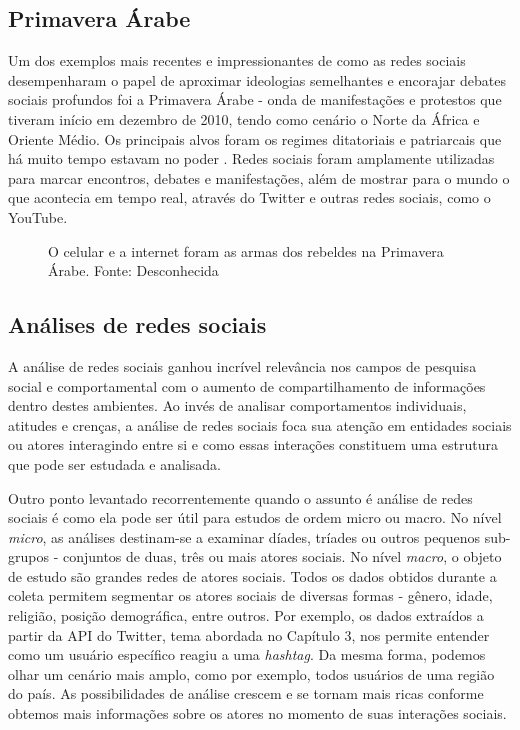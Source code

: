 \subsection{Primavera Árabe}
Um dos exemplos mais recentes e impressionantes de como as redes sociais desempenharam o papel de aproximar ideologias semelhantes e encorajar debates sociais profundos foi a Primavera Árabe - onda de manifestações e protestos que tiveram início em dezembro de 2010, tendo como cenário o Norte da África e Oriente Médio. Os principais alvos foram os regimes ditatoriais e patriarcais que há muito tempo estavam no poder \cite{howard2011opening}. Redes sociais foram amplamente utilizadas para marcar encontros, debates e manifestações, além de mostrar para o mundo o que acontecia em tempo real, através do Twitter e outras redes sociais, como o YouTube.

\begin{figure}[H]
	\centering{}
	\caption{O celular e a internet foram as armas dos rebeldes na Primavera Árabe. Fonte: Desconhecida}
	\label{uni}
\end{figure}

\subsection{Análises de redes sociais}
A análise de redes sociais ganhou incrível relevância nos campos de pesquisa social e comportamental\cite{wasserman1994advances} com o aumento de compartilhamento de informações dentro destes ambientes. Ao invés de analisar comportamentos individuais, atitudes e crenças, a análise de redes sociais foca sua atenção em entidades sociais ou atores interagindo entre si e como essas interações constituem uma estrutura que pode ser estudada e analisada.

Outro ponto levantado recorrentemente quando o assunto é análise de redes sociais é como ela pode ser útil para estudos de ordem micro ou macro. No nível \textit{micro}, as análises destinam-se a examinar díades, tríades ou outros pequenos sub-grupos - conjuntos de duas, três ou mais atores sociais. No nível \textit{macro}, o objeto de estudo são grandes redes de atores sociais.
Todos os dados obtidos durante a coleta permitem segmentar os atores sociais de diversas formas - gênero, idade, religião, posição demográfica, entre outros. Por exemplo, os dados extraídos a partir da API do Twitter, tema abordada no Capítulo 3, nos permite entender como um usuário específico reagiu a uma \textit{hashtag}. Da mesma forma, podemos olhar um cenário mais amplo, como por exemplo, todos usuários de uma região do país. As possibilidades de análise crescem e se tornam mais ricas conforme obtemos mais informações sobre os atores no momento de suas interações sociais.

